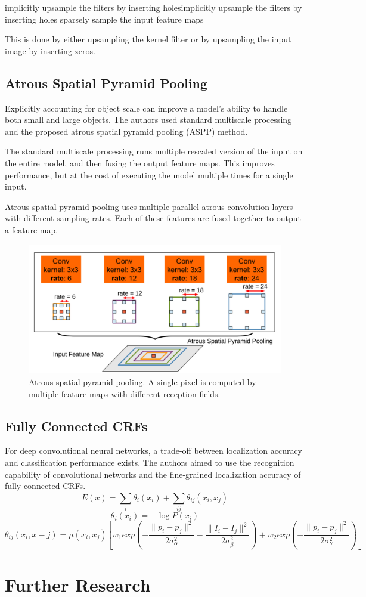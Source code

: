 \documentclass[10pt,twocolumn,letterpaper]{article}
\begin{document}
implicitly upsample the filters by inserting holesimplicitly upsample the filters by inserting holes
sparsely sample the input feature maps

This is done by either upsampling the kernel filter or by upsampling the input image by
inserting zeros.

\subsection{Atrous Spatial Pyramid Pooling}
Explicitly accounting for object scale can improve a model's ability to handle both
small and large objects. The authors used standard multiscale processing and the
proposed atrous spatial pyramid pooling (ASPP) method.

The standard multiscale processing runs multiple rescaled version of the input on 
the entire model, and then fusing the output feature maps. This improves performance,
but at the cost of executing the model multiple times for a single input.

Atrous spatial pyramid pooling uses multiple parallel atrous convolution layers
with different sampling rates. Each of these features are fused together to output
a feature map.

\begin{figure}[ht]
  \centering
   \includegraphics[width=\linewidth]{figures/ASPP.jpeg}
   \caption{Atrous spatial pyramid pooling. A single pixel is computed by multiple
       feature maps with different reception fields.
   }
\end{figure}

\subsection{Fully Connected CRFs}
For deep convolutional neural networks, a trade-off between localization accuracy and
classification performance exists. The authors aimed to use the recognition capability
of convolutional networks and the fine-grained localization accuracy of fully-connected
CRFs.
\[
    E(x) = \sum_i {\theta_i (x_i)} + \sum_{ij} \theta_{ij}{(x_i, x_j)}
\]
\[
    \theta_i (x_i) = -\log P(x_i)
\]
\[
    \theta_{ij}(x_i, x-j) = \mu(x_i, x_j)\left[
        w_1 exp(-\frac{\|p_i - p_j\|^2}{2\sigma^2_\alpha} -\frac{\|I_i - I_j\|^2}{2\sigma^2_\beta})
        + w_2 exp(-\frac{\|p_i - p_j\|^2}{2\sigma^2_\gamma})
    \right]
\]

\section{Further Research}

{\small   }
\end{document}
